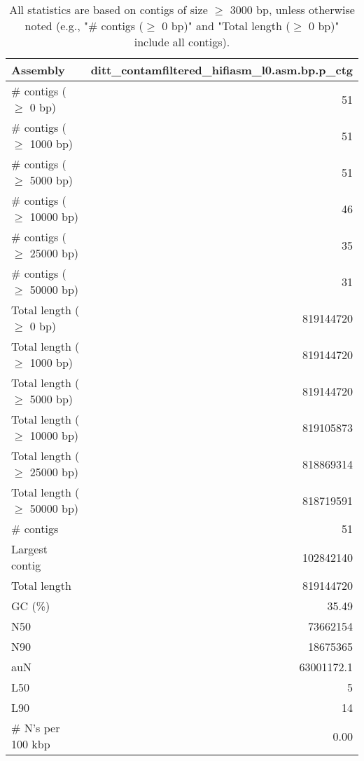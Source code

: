 \documentclass[12pt,a4paper]{article}
\begin{document}
\begin{table}[ht]
\begin{center}
\caption{All statistics are based on contigs of size $\geq$ 3000 bp, unless otherwise noted (e.g., "\# contigs ($\geq$ 0 bp)" and "Total length ($\geq$ 0 bp)" include all contigs).}
\begin{tabular}{|l*{1}{|r}|}
\hline
Assembly & ditt\_contamfiltered\_hifiasm\_l0.asm.bp.p\_ctg \\ \hline
\# contigs ($\geq$ 0 bp) & 51 \\ \hline
\# contigs ($\geq$ 1000 bp) & 51 \\ \hline
\# contigs ($\geq$ 5000 bp) & 51 \\ \hline
\# contigs ($\geq$ 10000 bp) & 46 \\ \hline
\# contigs ($\geq$ 25000 bp) & 35 \\ \hline
\# contigs ($\geq$ 50000 bp) & 31 \\ \hline
Total length ($\geq$ 0 bp) & 819144720 \\ \hline
Total length ($\geq$ 1000 bp) & 819144720 \\ \hline
Total length ($\geq$ 5000 bp) & 819144720 \\ \hline
Total length ($\geq$ 10000 bp) & 819105873 \\ \hline
Total length ($\geq$ 25000 bp) & 818869314 \\ \hline
Total length ($\geq$ 50000 bp) & 818719591 \\ \hline
\# contigs & 51 \\ \hline
Largest contig & 102842140 \\ \hline
Total length & 819144720 \\ \hline
GC (\%) & 35.49 \\ \hline
N50 & 73662154 \\ \hline
N90 & 18675365 \\ \hline
auN & 63001172.1 \\ \hline
L50 & 5 \\ \hline
L90 & 14 \\ \hline
\# N's per 100 kbp & 0.00 \\ \hline
\end{tabular}
\end{center}
\end{table}
\end{document}
